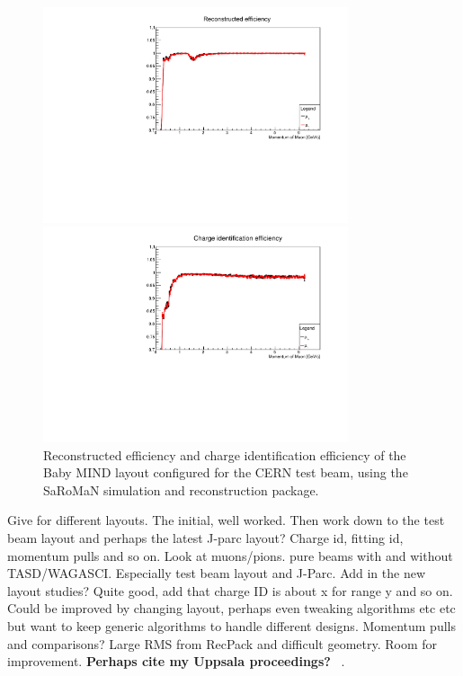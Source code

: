 \begin{figure}[h!]
\centering
\includegraphics[width=0.8\textwidth]{figures/oldStudies/FullFitted.pdf}

\includegraphics[width=0.8\textwidth]{figures/oldStudies/FullChargeID.pdf}
\caption{Reconstructed efficiency and charge identification efficiency of the Baby MIND layout configured for the CERN test beam, using the SaRoMaN simulation and reconstruction package.}
\label{fig:TestBeamMIND2}
\end{figure}

Give for different layouts. The initial, well worked. Then work down to the test beam layout and perhaps the latest J-parc layout? 
Charge id, fitting id, momentum pulls and so on.
Look at muons/pions. pure beams with and without TASD/WAGASCI. Especially test beam layout and J-Parc.
Add in the new layout studies?
Quite good, add that charge ID is about x for range y and so on.  Could be improved by changing layout, perhaps even tweaking algorithms etc etc but want to keep generic algorithms to handle different designs.
Momentum pulls and comparisons? Large RMS from RecPack and difficult geometry. Room for improvement.
\textbf{Perhaps cite my Uppsala proceedings?} ~\cite{82Uppsala}.
\fi

